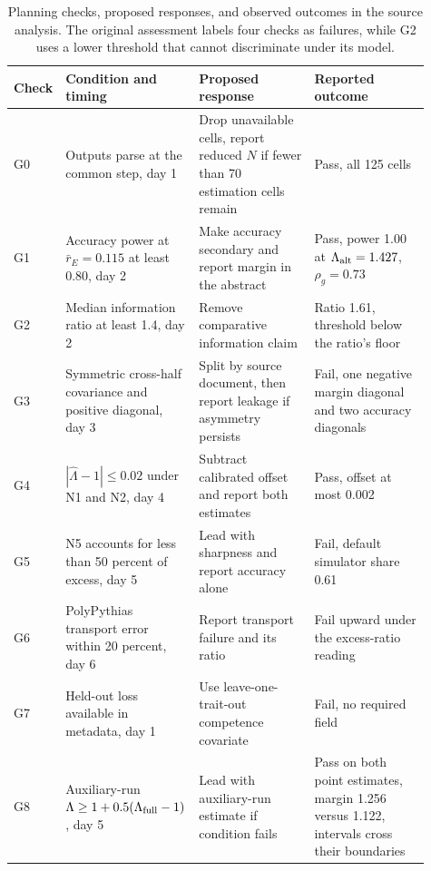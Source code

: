 \begin{table}[!htb]
\centering
\caption{Planning checks, proposed responses, and observed outcomes in the source analysis. The original assessment labels four checks as failures, while G2 uses a lower threshold that cannot discriminate under its model.}
\label{tab:original5}
\small\setlength{\tabcolsep}{4pt}\renewcommand{\arraystretch}{1.12}
\begin{tabular}{L{0.07\linewidth}L{0.28\linewidth}L{0.28\linewidth}L{0.28\linewidth}}\toprule
Check & Condition and timing & Proposed response & Reported outcome\\\midrule
G0 & Outputs parse at the common step, day 1 & Drop unavailable cells, report reduced $N$ if fewer than 70 estimation cells remain & Pass, all 125 cells\\
G1 & Accuracy power at $\bar r_E=0.115$ at least 0.80, day 2 & Make accuracy secondary and report margin in the abstract & Pass, power 1.00 at $\Lambda_{\rm alt}=1.427$, $\rho_g=0.73$\\
G2 & Median information ratio at least 1.4, day 2 & Remove comparative information claim & Ratio 1.61, threshold below the ratio's floor\\
G3 & Symmetric cross-half covariance and positive diagonal, day 3 & Split by source document, then report leakage if asymmetry persists & Fail, one negative margin diagonal and two accuracy diagonals\\
G4 & $|\widehat\Lambda-1|\leq0.02$ under N1 and N2, day 4 & Subtract calibrated offset and report both estimates & Pass, offset at most 0.002\\
G5 & N5 accounts for less than 50 percent of excess, day 5 & Lead with sharpness and report accuracy alone & Fail, default simulator share 0.61\\
G6 & PolyPythias transport error within 20 percent, day 6 & Report transport failure and its ratio & Fail upward under the excess-ratio reading\\
G7 & Held-out loss available in metadata, day 1 & Use leave-one-trait-out competence covariate & Fail, no required field\\
G8 & Auxiliary-run $\Lambda\geq1+0.5(\Lambda_{\rm full}-1)$, day 5 & Lead with auxiliary-run estimate if condition fails & Pass on both point estimates, margin 1.256 versus 1.122, intervals cross their boundaries\\\bottomrule
\end{tabular}
\end{table}

